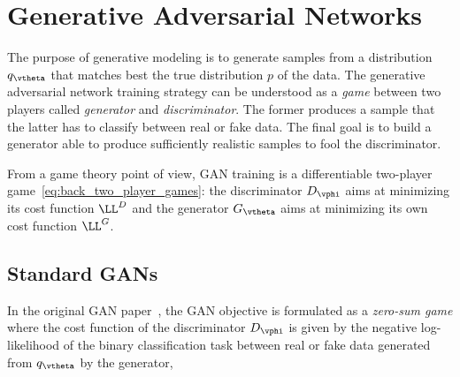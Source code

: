 
















\section{Generative Adversarial Networks}







The purpose of generative modeling is to generate samples from a distribution $q_\vtheta$ that matches best the true distribution $p$ of the data. The generative adversarial network training strategy can be understood as a \emph{game} between two players called \emph{generator} and \emph{discriminator}. The former produces a sample that the latter has to classify between real or fake data. The final goal is to build a generator able to produce sufficiently realistic samples to fool the discriminator.







From a game theory point of view, GAN training is a differentiable two-player game~\eqref{eq:back_two_player_games}: the discriminator $D_{\vphi}$ aims at minimizing its cost function $\LL^{D}$ and the generator $G_{\vtheta}$ aims at minimizing its own cost function $\LL^G$.




\subsection{Standard GANs}




In the original GAN paper~\citep{goodfellow2014generative}, the GAN objective is formulated as a \emph{zero-sum game} where the cost function of the discriminator $D_\vphi$ is given by the negative log-likelihood of the binary classification task between real or fake data generated from $q_\vtheta$ by the generator, 

